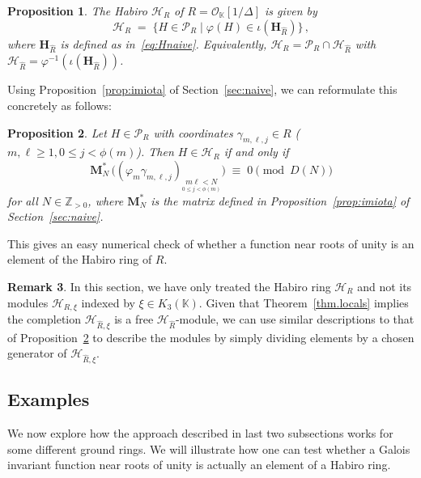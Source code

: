 \documentclass[12pt,reqno]{amsart}
\newtheorem{proposition}{Proposition}[section]
\theoremstyle{definition}
\newtheorem{remark}[proposition]{Remark}
\def\BZ{\mathbb Z}
\def\BK{\mathbb K}
\def\bM{\mathbf{M}}
\def\calP{\mathcal P}
\def\calH{\mathcal H}
\def\HH{\mathbf H}
\def\be{\begin{equation}}
\def\ee{\end{equation}}
\def\calO{\mathcal{O}}
\def\={\;=\;}
\begin{document}
\begin{proposition}
The Habiro $\calH_R$ of $R=\calO_{\BK}[1/\Delta]$ is given by
\be
  \calH_R
  \=\big\{H\in\calP_R\;\big|\;\varphi(H)\in\iota(\HH_{\widehat{R}})\big\}\,,
\ee
where $\HH_{\widehat{R}}$ is defined as in~\eqref{eq:Hnaive}. Equivalently,
$\calH_R=\calP_R\cap\calH_{\widehat{R}}$ with
$\calH_{\widehat{R}}=\varphi^{-1}(\iota(\HH_{\widehat{R}}))$.
\end{proposition}

\noindent Using Proposition~\ref{prop:imiota} of Section~\ref{sec:naive}, we can
reformulate this concretely as follows:

\begin{proposition}
\label{prop:hr.cong}
Let $H\in\calP_{R}$ with coordinates $\gamma_{m,\ell,j}\in R$
($m,\ell\geq 1,0\leq j<\phi(m)$). Then $H\in\calH_R$
if and only if
\be
\bM_{N}^{*} \,
\Big((\varphi_m\gamma_{m,\ell,j})_{\underset{0\leq j<\phi(m)}{m\ell<N}}\Big)
\;\equiv\; 0\pmod{D(N)}
\ee
for all $N\in\BZ_{>0}$, where $\bM_{N}^{*}$ is the matrix defined in
Proposition~\ref{prop:imiota} of Section~\ref{sec:naive}.
\end{proposition}

\noindent This gives an easy numerical check of whether a function near roots of
unity is an element of the Habiro ring of $R$.

\begin{remark}
In this section, we have only treated the Habiro ring $\calH_R$ and not its modules
$\calH_{R,\xi}$ indexed by $\xi\in K_3(\BK)$. Given that Theorem~\ref{thm.locals}
implies the completion $\calH_{\widehat{R},\xi}$ is a free $\calH_{\widehat{R}}$-module,
we can use similar descriptions to that of Proposition~\ref{prop:hr.cong} to describe
the modules by simply dividing elements by a chosen generator of
$\calH_{\widehat{R},\xi}$.
\end{remark}

\subsection{Examples}
\label{sub.examples2}

We now explore how the approach described in last two subsections works for some
different ground rings. We will illustrate how one can test whether a Galois
invariant function near roots of unity is actually an element of a Habiro ring.
\end{document}
